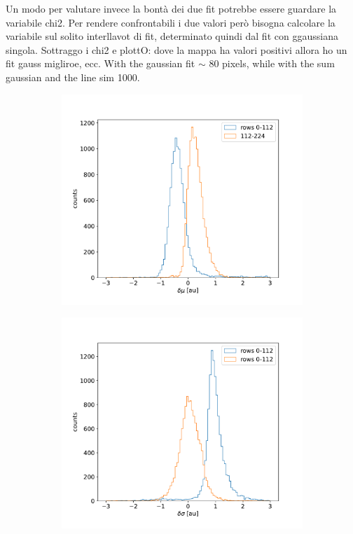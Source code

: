         Un modo per valutare invece la bontà dei due fit potrebbe essere guardare la variabile chi2. Per rendere confrontabili i due valori però  bisogna calcolare la variabile sul solito interllavot di fit, determinato quindi dal fit con ggaussiana singola. 
        Sottraggo i chi2 e plottO: dove la mappa ha valori positivi allora ho un fit gauss migliroe, ecc. 
        With the gaussian fit $\sim$ 80 pixels, while with the sum gaussian and the line sim 1000. 
        \begin{figure}[h!]
            \begin{subfigure}{.5\textwidth}
            \centering
            \includegraphics[width=.99\linewidth]{figures/charaterization/deltam_Fe.pdf}
            \label{fig:}
            \end{subfigure}
            \begin{subfigure}{.5\textwidth}
            \centering
            \includegraphics[width=.99\linewidth]{figures/charaterization/deltas_Fe.pdf}
            \label{fig:}
            \end{subfigure}
            \caption{}
        \end{figure}            

